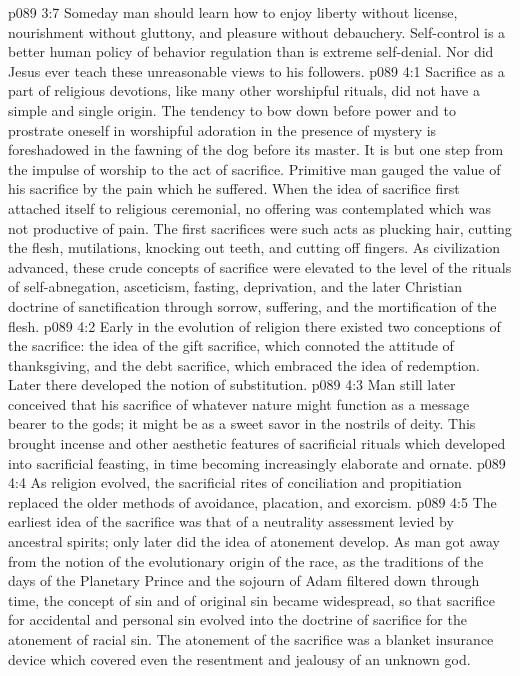 \pc \vs p089 3:7 Someday man should learn how to enjoy liberty without license, nourishment without gluttony, and pleasure without debauchery. Self\hyp{}control is a better human policy of behavior regulation than is extreme self\hyp{}denial. Nor did Jesus ever teach these unreasonable views to his followers.\plusone
{}
\vs p089 4:1 Sacrifice as a part of religious devotions, like many other worshipful rituals, did not have a simple and single origin. The tendency to bow down before power and to prostrate oneself in worshipful adoration in the presence of mystery is foreshadowed in the fawning of the dog before its master. It is but one step from the impulse of worship to the act of sacrifice. Primitive man gauged the value of his sacrifice by the pain which he suffered. When the idea of sacrifice first attached itself to religious ceremonial, no offering was contemplated which was not productive of pain. The first sacrifices were such acts as plucking hair, cutting the flesh, mutilations, knocking out teeth, and cutting off fingers. As civilization advanced, these crude concepts of sacrifice were elevated to the level of the rituals of self\hyp{}abnegation, asceticism, fasting, deprivation, and the later Christian doctrine of sanctification through sorrow, suffering, and the mortification of the flesh.
\vs p089 4:2 Early in the evolution of religion there existed two conceptions of the sacrifice: the idea of the gift sacrifice, which connoted the attitude of thanksgiving, and the debt sacrifice, which embraced the idea of redemption. Later there developed the notion of substitution.
\vs p089 4:3 Man still later conceived that his sacrifice of whatever nature might function as a message bearer to the gods; it might be as a sweet savor in the nostrils of deity. This brought incense and other aesthetic features of sacrificial rituals which developed into sacrificial feasting, in time becoming increasingly elaborate and ornate.
\pc \vs p089 4:4 As religion evolved, the sacrificial rites of conciliation and propitiation replaced the older methods of avoidance, placation, and exorcism.
\vs p089 4:5 The earliest idea of the sacrifice was that of a neutrality assessment levied by ancestral spirits; only later did the idea of atonement develop. As man got away from the notion of the evolutionary origin of the race, as the traditions of the days of the Planetary Prince and the sojourn of Adam filtered down through time, the concept of sin and of original sin became widespread, so that sacrifice for accidental and personal sin evolved into the doctrine of sacrifice for the atonement of racial sin. The atonement of the sacrifice was a blanket insurance device which covered even the resentment and jealousy of an unknown god.

